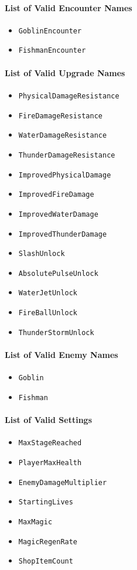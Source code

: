 \paragraph{List of Valid Encounter Names}
\begin{itemize}
    \item \texttt{GoblinEncounter}
    \item \texttt{FishmanEncounter}
\end{itemize}

\paragraph{List of Valid Upgrade Names}
\begin{itemize}
    \item \texttt{PhysicalDamageResistance}
    \item \texttt{FireDamageResistance}
    \item \texttt{WaterDamageResistance}
    \item \texttt{ThunderDamageResistance}
    \item \texttt{ImprovedPhysicalDamage}
    \item \texttt{ImprovedFireDamage}
    \item \texttt{ImprovedWaterDamage}
    \item \texttt{ImprovedThunderDamage}
    \item \texttt{SlashUnlock}
    \item \texttt{AbsolutePulseUnlock}
    \item \texttt{WaterJetUnlock}
    \item \texttt{FireBallUnlock}
    \item \texttt{ThunderStormUnlock}
\end{itemize}

\paragraph{List of Valid Enemy Names}
\begin{itemize}
    \item \texttt{Goblin}
    \item \texttt{Fishman}
\end{itemize}

\paragraph{List of Valid Settings}
\begin{itemize}
    \item \texttt{MaxStageReached}
    \item \texttt{PlayerMaxHealth}
    \item \texttt{EnemyDamageMultiplier}
    \item \texttt{StartingLives}
    \item \texttt{MaxMagic}
    \item \texttt{MagicRegenRate}
    \item \texttt{ShopItemCount}
\end{itemize}

